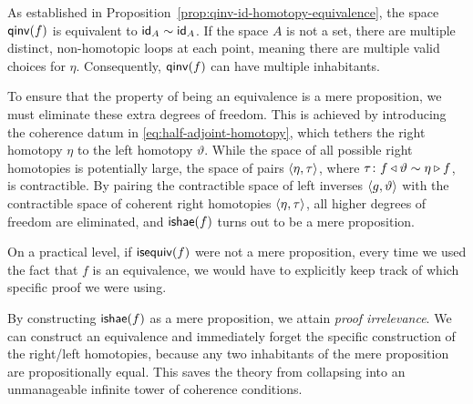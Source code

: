 As established in Proposition~\ref{prop:qinv-id-homotopy-equivalence}, the space $\mathsf{qinv}(f)$ is equivalent to $\mathsf{id}_A\sim\mathsf{id}_A$. If the space $A$ is not a set, there are multiple distinct, non-homotopic loops at each point, meaning there are multiple valid choices for $\eta$. Consequently, $\mathsf{qinv}(f)$ can have multiple inhabitants.

To ensure that the property of being an equivalence is a mere proposition, we must eliminate these extra degrees of freedom. This is achieved by introducing the coherence datum in \eqref{eq:half-adjoint-homotopy}, which tethers the right homotopy $\eta$ to the left homotopy $\vartheta$. While the space of all possible right homotopies is potentially large, the space of pairs $\langle\eta,\tau\rangle$, where $\tau\colon f\lwct\vartheta\sim\eta\rwct f$, is contractible. By pairing the contractible space of left inverses $\langle g,\vartheta\rangle$ with the contractible space of coherent right homotopies $\langle\eta,\tau\rangle$, all higher degrees of freedom are eliminated, and $\mathsf{ishae}(f)$ turns out to be a mere proposition.

On a practical level, if $\mathsf{isequiv}(f)$ were not a mere proposition, every time we used the fact that $f$ is an equivalence, we would have to explicitly keep track of which specific proof we were using.

By constructing $\mathsf{ishae}(f)$ as a mere proposition, we attain \textit{proof irrelevance}. We can construct an equivalence and immediately forget the specific construction of the right/left homotopies, because any two inhabitants of the mere proposition are propositionally equal. This saves the theory from collapsing into an unmanageable infinite tower of coherence conditions.


